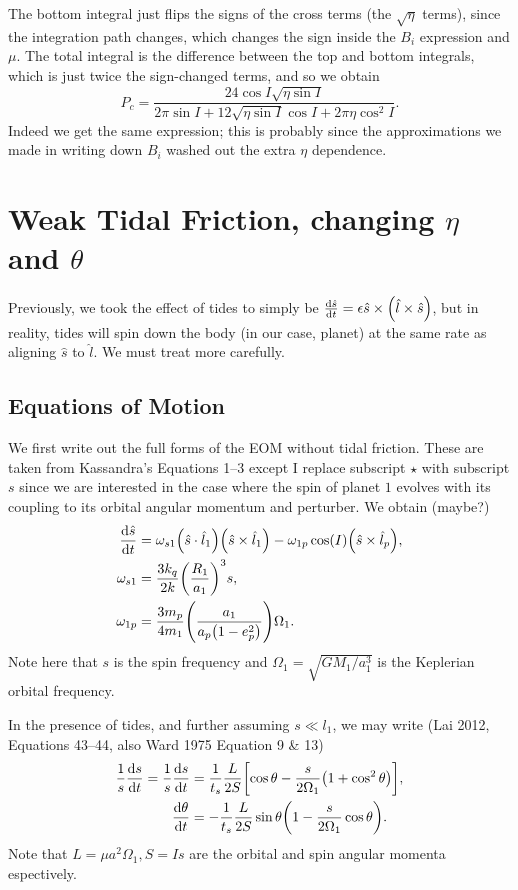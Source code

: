 \documentclass[11pt,
        usenames, %
        dvipsnames %
    ]{article}
\newcommand*{\rd}[2]{\frac{\mathrm{d}#1}{\mathrm{d}#2}}
\DeclarePairedDelimiter\p{\lparen}{\rparen}
\DeclarePairedDelimiter\s{\lbrack}{\rbrack}
\begin{document}
The bottom integral just flips the signs of the cross terms (the $\sqrt{\eta}$
terms), since the integration path changes, which changes the sign inside the
$B_i$ expression and $\mu$. The total integral is the difference between the top
and bottom integrals, which is just twice the sign-changed terms, and so we
obtain
\begin{equation}
    P_c = \frac{24\cos I \sqrt{\eta \sin I}}{
            2\pi \sin I + 12\sqrt{\eta \sin I}\cos I + 2\pi \eta \cos^2 I}.
\end{equation}
Indeed we get the same expression; this is probably since the approximations we
made in writing down $B_i$ washed out the extra $\eta$ dependence.

\section{Weak Tidal Friction, changing $\eta$ and $\theta$}

Previously, we took the effect of tides to simply be $\rd{\hat{s}}{t} = \epsilon
\hat{s} \times \p*{\hat{l} \times \hat{s}}$, but in reality, tides will spin
down the body (in our case, planet) at the same rate as aligning $\hat{s}$ to
$\hat{l}$. We must treat more carefully.

\subsection{Equations of Motion}

We first write out the full forms of the EOM without tidal friction. These are
taken from Kassandra's Equations 1--3 except I replace subscript $\star$ with
subscript $s$ since we are interested in the case where the spin of planet $1$
evolves with its coupling to its orbital angular momentum and perturber. We
obtain (maybe?)
\begin{align}
    \rd{\hat{s}}{t}
        &= \omega_{s1}\p*{\hat{s} \cdot \hat{l}_1}\p*{\hat{s} \times \hat{l}_1}
            - \omega_{1p}\cos(I)\p*{\hat{s} \times \hat{l}_p},\\
    \omega_{s1} &= \frac{3k_q}{2k} \p*{\frac{R_1}{a_1}}^3 s,\\
    \omega_{1p} &= \frac{3m_p}{4m_1}\p*{\frac{a_1}{a_p\p*{1 - e_p^2}}} \Omega_1.
\end{align}
Note here that $s$ is the spin frequency and $\Omega_1 =
\sqrt{GM_1/a_1^3}$ is the Keplerian orbital frequency.

In the presence of tides, and further assuming $s \ll l_1$, we may write (Lai
2012, Equations 43--44, also Ward 1975 Equation 9 \& 13)
\begin{align}
    \frac{1}{s}\rd{s}{t}
        = \frac{1}{s}\rd{s}{t}
        &= \frac{1}{t_s}\frac{L}{2S}\s*{\cos\theta
            - \frac{s}{2\Omega_1}\p*{1 + \cos^2\theta}},\\
    \rd{\theta}{t} &= -\frac{1}{t_s}\frac{L}{2S}
        \sin\theta\p*{1 - \frac{s}{2\Omega_1}\cos\theta}.
\end{align}
Note that $L = \mu a^2\Omega_1, S = Is$ are the orbital and spin angular momenta
espectively.
\end{document}
